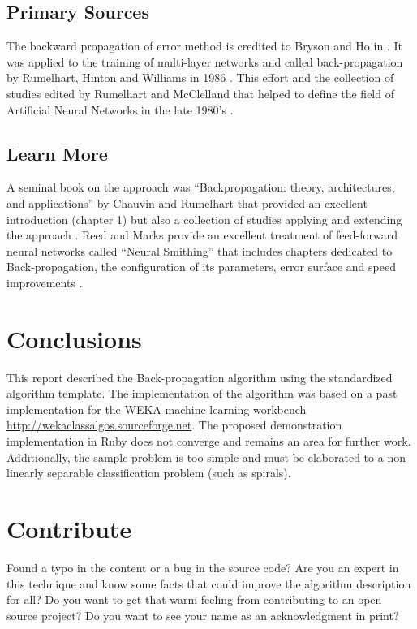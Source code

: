 \documentclass[a4paper, 11pt]{article}
\begin{document}
% 
% 
\subsection{Primary Sources}
The backward propagation of error method is credited to Bryson and Ho in \cite{Bryson1969}. It was applied to the training of multi-layer networks and called back-propagation by Rumelhart, Hinton and Williams in 1986 \cite{Rumelhart1986b, Rumelhart1986c}. 
This effort and the collection of studies edited by Rumelhart and McClelland that helped to define the field of Artificial Neural Networks in the late 1980's \cite{Rumelhart1986, Rumelhart1986a}.


% 
% 
\subsection{Learn More}
A seminal book on the approach was ``Backpropagation: theory, architectures, and applications'' by Chauvin and Rumelhart that provided an excellent introduction (chapter 1) but also a collection of studies applying and extending the approach \cite{Chauvin1995}.
Reed and Marks provide an excellent treatment of feed-forward neural networks called ``Neural Smithing'' that includes chapters dedicated to Back-propagation, the configuration of its parameters, error surface and speed improvements \cite{Reed1999}.

% 
% 
\section{Conclusions}
\label{sec:conclusions}
This report described the Back-propagation algorithm using the standardized algorithm template. The implementation of the algorithm was based on a past implementation for the WEKA machine learning workbench \url{http://wekaclassalgos.sourceforge.net}. The proposed demonstration implementation in Ruby does not converge and remains an area for further work. Additionally, the sample problem is too simple and must be elaborated to a non-linearly separable classification problem (such as spirals).

% 
% 
\section{Contribute}
\label{sec:contribute}
Found a typo in the content or a bug in the source code? 
Are you an expert in this technique and know some facts that could improve the algorithm description for all?
Do you want to get that warm feeling from contributing to an open source project? 
Do you want to see your name as an acknowledgment in print?
\end{document}
